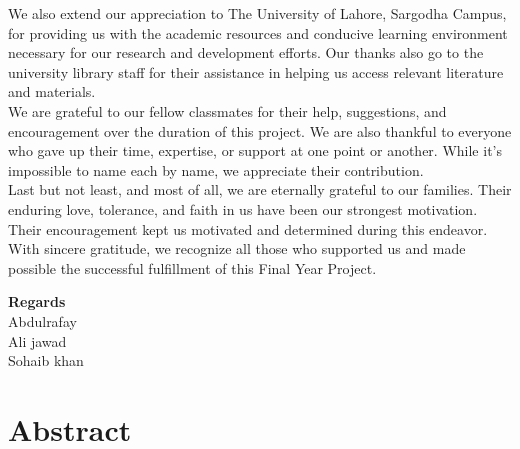 \documentclass[12pt,a4paper]{report}
\begin{document}
\noindent We also extend our appreciation to The University of Lahore, Sargodha Campus, for providing us with the academic resources and conducive learning environment necessary for our research and development efforts. Our thanks also go to the university library staff for their assistance in helping us access relevant literature and materials.
\\

\noindent We are grateful to our fellow classmates for their help, suggestions, and encouragement over the duration of this project. We are also thankful to everyone who gave up their time, expertise, or support at one point or another. While it's impossible to name each by name, we appreciate their contribution.
\\

\noindent Last but not least, and most of all, we are eternally grateful to our families. Their enduring love, tolerance, and faith in us have been our strongest motivation. Their encouragement kept us motivated and determined during this endeavor. With sincere gratitude, we recognize all those who supported us and made possible the successful fulfillment of this Final Year Project.\\[1.5cm]

\begin{flushright}
\textbf{Regards}\\
Abdulrafay\\
Ali jawad\\
Sohaib khan
\end{flushright}
\newpage
\chapter*{Abstract}
\end{document}
